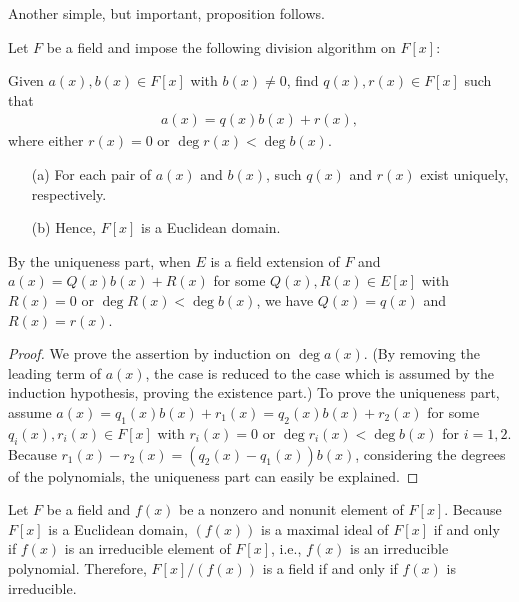 Another simple, but important, proposition follows.
\begin{thm}
    Let $F$ be a field and impose the following division algorithm on $F[x]$:
    \begin{center}
        Given $a(x), b(x)\in F[x]$ with $b(x)\neq 0$, find $q(x), r(x)\in F[x]$ such that
        \begin{align*}
            a(x)=q(x)b(x)+r(x),
        \end{align*}
        where either $r(x)=0$ or $\deg r(x)<\deg b(x)$.
    \end{center}
    \begin{enumerate}
        \item[(a)]
        {
            For each pair of $a(x)$ and $b(x)$, such $q(x)$ and $r(x)$ exist uniquely, respectively.
        }
        \item[(b)]
        {
            Hence, $F[x]$ is a Euclidean domain.
        }
    \end{enumerate}
\end{thm}
\begin{rmk}
    By the uniqueness part, when $E$ is a field extension of $F$ and $a(x)=Q(x)b(x)+R(x)$ for some $Q(x), R(x)\in E[x]$ with $R(x)=0$ or $\deg R(x)<\deg b(x)$, we have $Q(x)=q(x)$ and $R(x)=r(x)$.
\end{rmk}
\begin{proof}
    We prove the assertion by induction on $\deg a(x)$.
    \color{brown}(By removing the leading term of $a(x)$, the case is reduced to the case which is assumed by the induction hypothesis, proving the existence part.) \color{black}
    To prove the uniqueness part, assume $a(x)=q_1(x)b(x)+r_1(x)=q_2(x)b(x)+r_2(x)$ for some $q_i(x), r_i(x)\in F[x]$ with $r_i(x)=0$ or $\deg r_i(x)<\deg b(x)$ for $i=1, 2$.
    Because $r_1(x)-r_2(x)=(q_2(x)-q_1(x))b(x)$, considering the degrees of the polynomials, the uniqueness part can easily be explained.
\end{proof}

\begin{cor}
    Let $F$ be a field and $f(x)$ be a nonzero and nonunit element of $F[x]$.
    Because $F[x]$ is a Euclidean domain, $(f(x))$ is a maximal ideal of $F[x]$ if and only if $f(x)$ is an irreducible element of $F[x]$, i.e., $f(x)$ is an irreducible polynomial.
    Therefore, $F[x]/(f(x))$ is a field if and only if $f(x)$ is irreducible.
\end{cor}

